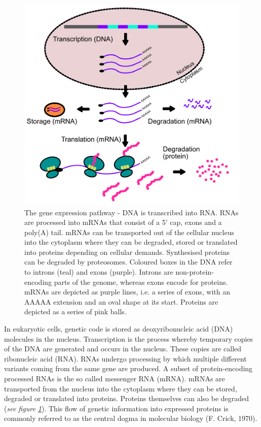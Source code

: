 \documentclass[12pt,openany]{book}
\begin{document}
\begin{figure}
  \includegraphics{./figures/geneExprPath_2.pdf}
  \caption{The gene expression pathway - DNA is transcribed into RNA. RNAs are processed into mRNAs that consist of a 5' cap, exons and a poly(A) tail. mRNAs can be transported out of the cellular nucleus into the cytoplasm where they can be degraded, stored or translated into proteins depending on cellular demands. Synthesised proteins can be degraded by proteosomes. Coloured boxes in the DNA refer to introns (teal) and exons (purple). Introns are non-protein-encoding parts of the genome, whereas exons encode for proteins. mRNAs are depicted as purple lines, i.e. a series of exons, with an AAAAA extension and an oval shape at its start. Proteins are depicted as a series of pink balls.  \label{fig:geneExprPath}}
\end{figure}

In eukaryotic cells, genetic code is stored as deoxyribonucleic acid
(DNA) molecules in the nucleus. Transcription is the process whereby
temporary copies of the DNA are generated and occurs in the nucleus.
These copies are called ribonucleic acid (RNA). RNAs undergo processing
by which multiple different variants coming from the same gene are
produced. A subset of protein-encoding processed RNAs is the so called
messenger RNA (mRNA). mRNAs are transported from the nucleus into the
cytoplasm where they can be stored, degraded or translated into
proteins. Proteins themselves can also be degraded (\emph{see figure
\ref{fig:geneExprPath}}). This flow of genetic information into
expressed proteins is commonly referred to as the central dogma in
molecular biology (F. Crick, 1970). \clearpage
\end{document}
